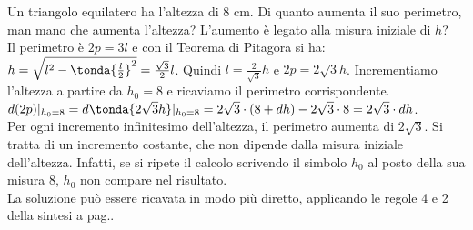 \begin{esempio}
Un triangolo equilatero ha l'altezza di $8$ cm. 
Di quanto aumenta il suo perimetro, man mano che aumenta l'altezza? 
L'aumento è legato alla misura iniziale di $h$?\\
Il perimetro è $2p=3l$ e con il Teorema di Pitagora si ha: 
$h=\sqrt{l^2-\tonda{\frac{l}{2}}^2}=\frac{\sqrt{3}}{2}l$. 
Quindi $l=\frac{2}{\sqrt{3}}h$ e $2p=2\sqrt{3}h$. 
Incrementiamo l'altezza a partire da $h_0=8$ e ricaviamo il perimetro 
corrispondente.\\
$d(2p)|_{h_0=8}=
d\tonda{2\sqrt{3}h}|_{h_0=8}=
2 \sqrt{3} \cdot (8+dh)-2\sqrt{3} \cdot 8 = 2 \sqrt{3} \cdot dh$.\\
Per ogni incremento infinitesimo dell'altezza, il perimetro aumenta di 
$2 \sqrt{3}$.
Si tratta di un incremento costante, che non dipende dalla misura iniziale
dell'altezza. Infatti, se si ripete il calcolo scrivendo il simbolo $h_0$ al 
posto della 
sua misura $8$, $h_0$ non compare nel risultato.\\
La soluzione può essere ricavata in modo più diretto, applicando le regole
4 e 2 della sintesi a pag.\pageref{subsubsec:diff01_diffsint}.
\end{esempio}

